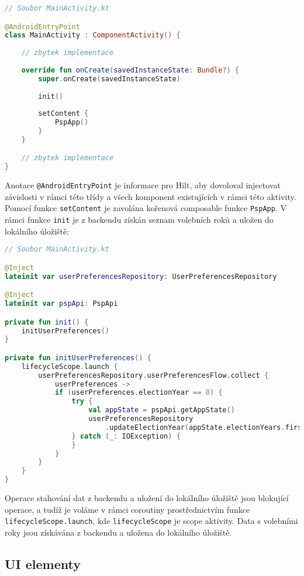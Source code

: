 \begin{lstlisting}[caption={Třída activity}, tabsize=2, language=Kotlin]
// Soubor MainActivity.kt

@AndroidEntryPoint
class MainActivity : ComponentActivity() {
	
	// zbytek implementace
	
	override fun onCreate(savedInstanceState: Bundle?) {
		super.onCreate(savedInstanceState)
		
		init()
		
		setContent {
			PspApp()
		}
	}

	// zbytek implementace
}
\end{lstlisting}

\noindent Anotace \lstinline|@AndroidEntryPoint| je informace pro Hilt, aby dovoloval injectovat závislosti v rámci této třídy a všech komponent existujících v rámci této aktivity. Pomocí funkce \lstinline|setContent| je zavolána kořenová composable funkce \lstinline|PspApp|. V rámci funkce \lstinline|init| je z backendu získán seznam volebních roků a uložen do lokálního úložiště:

\newpage

\begin{lstlisting}[caption={Třída activity}, tabsize=2, language=Kotlin]
// Soubor MainActivity.kt

@Inject
lateinit var userPreferencesRepository: UserPreferencesRepository

@Inject
lateinit var pspApi: PspApi

private fun init() {
	initUserPreferences()
}

private fun initUserPreferences() {
	lifecycleScope.launch {
		userPreferencesRepository.userPreferencesFlow.collect { 
			userPreferences ->
			if (userPreferences.electionYear == 0) {
				try {
					val appState = pspApi.getAppState()
					userPreferencesRepository
						.updateElectionYear(appState.electionYears.first())
				} catch (_: IOException) {
				}
			}
		}
	}
}
\end{lstlisting}

\noindent Operace stahování dat z backendu a uložení do lokálního úložiště jsou blokující operace, a tudíž je voláme v rámci coroutiny prostřednictvím funkce \lstinline|lifecycleScope.launch|, kde \lstinline|lifecycleScope| je scope aktivity. Data s volebními roky jsou získávána z backendu a uložena do lokálního úložiště.

\subsection*{UI elementy}

